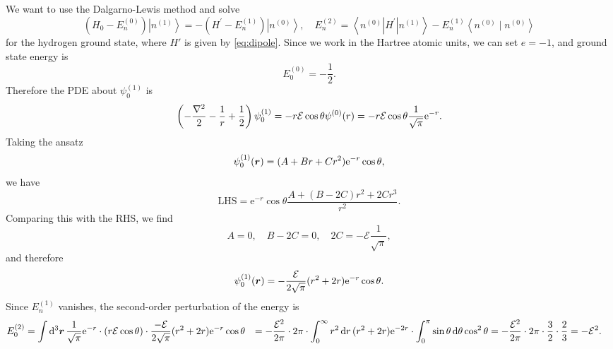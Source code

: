 \documentclass[hyperref, a4paper]{article}
\newcommand*{\ee}{\mathrm{e}}
\def\\{}%
\begin{document}
\subsection{}

We want to use the Dalgarno-Lewis method and solve 
\begin{equation}
    \left(H_0-E_n^{(0)}\right)\left|n^{(1)}\right\rangle=-\left(H^{\prime}-E_n^{(1)}\right)\left|n^{(0)}\right\rangle, \quad 
    E_n^{(2)}=\left\langle n^{(0)}\left|H^{\prime}\right| n^{(1)}\right\rangle-E_n^{(1)}\left\langle n^{(0)} \mid n^{(0)}\right\rangle
\end{equation}
for the hydrogen ground state,
where $H'$ is given by \eqref{eq:dipole}.
Since we work in the Hartree atomic units, 
we can set $e = - 1$,
and ground state energy is 
\begin{equation}
    E_0^{(0)} = - \frac{1}{2}.
\end{equation}
Therefore the PDE about $\psi_0^{(1)}$ is 
\begin{equation}
    \left(
        - \frac{\laplacian}{2} - \frac{1}{r} + \frac{1}{2}
    \right) \psi_0^{(1)} = 
    - r \mathcal{E} \cos \theta \psi^{(0)} (r)
    = - r \mathcal{E} \cos \theta \frac{1}{\sqrt{\pi}} \ee^{- r}.
\end{equation}
Taking the ansatz 
\begin{equation}
    \psi^{(1)}_0(\vb*{r}) = (A + B r + C r^2) \ee^{-r} \cos \theta,
\end{equation}
we have 
\[
    \text{LHS} = \ee^{-r} \cos \theta \frac{A + (B - 2C) r^2 + 2 C r^3}{r^2}.
\]
Comparing this with the RHS, we find 
\[
    A = 0, \quad B - 2 C = 0, \quad 2 C = - \mathcal{E} \frac{1}{\sqrt{\pi}},
\]
and therefore 
\begin{equation}
    \psi^{(1)}_0(\vb*{r}) = - \frac{\mathcal{E}}{2 \sqrt{\pi}} (r^2 + 2 r) \ee^{-r} \cos \theta.
\end{equation}
Since $E_n^{(1)}$ vanishes, 
the second-order perturbation of the energy is 
\begin{equation}
    \begin{aligned}
        E_0^{(2)} &= \int \dd[3]{\vb*{r}} \frac{1}{\sqrt{\pi}} \ee^{- r} 
        \cdot (r \mathcal{E} \cos \theta)
        \cdot \frac{- \mathcal{E}}{2 \sqrt{\pi}} (r^2 + 2 r) \ee^{-r} \cos \theta \\
        &= - \frac{\mathcal{E}^2}{2 \pi} \cdot 2\pi \cdot 
        \int_{0}^{\infty} r^2 \dd{r} (r^2 + 2 r) \ee^{-2r} \cdot 
        \int_{0}^{\pi} \sin \theta \dd{\theta} \cos^2 \theta \\
        &= - \frac{\mathcal{E}^2}{2 \pi} \cdot 2\pi \cdot \frac{3}{2} \cdot \frac{2}{3} 
        = - \mathcal{E}^2.
    \end{aligned}
\end{equation}
\end{document}
